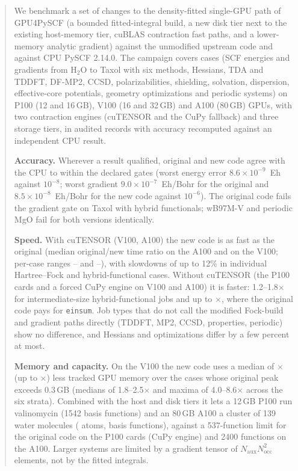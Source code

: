 \begin{abstract}
\noindent We benchmark a set of changes to the density-fitted single-GPU path of GPU4PySCF (a bounded fitted-integral build, a new disk tier next to the existing host-memory tier, cuBLAS contraction fast paths, and a lower-memory analytic gradient) against the unmodified upstream code and against CPU PySCF 2.14.0. The campaign covers \NCasesRun{} cases (SCF energies and gradients from H$_2$O to Taxol with six methods, Hessians, TDA and TDDFT, DF-MP2, CCSD, polarizabilities, shielding, solvation, dispersion, effective-core potentials, geometry optimizations and periodic systems) on P100 (12 and 16\,GB), V100 (16 and 32\,GB) and A100 (80\,GB) GPUs, with two contraction engines (cuTENSOR and the CuPy fallback) and three storage tiers, in \NAuditedRecords{} audited records with accuracy recomputed against an independent CPU result.

\noindent\textbf{Accuracy.} Wherever a result qualified, original and new code agree with the CPU to within the declared gates (worst energy error $8.6\times10^{-9}$~Eh against $10^{-8}$; worst gradient $9.0\times10^{-7}$~Eh/Bohr for the original and $8.5\times10^{-8}$~Eh/Bohr for the new code against $10^{-6}$). The original code fails the gradient gate on Taxol with hybrid functionals; wB97M-V and periodic MgO fail for both versions identically.

\noindent\textbf{Speed.} With cuTENSOR (V100, A100) the new code is as fast as the original (median original/new time ratio \MedianAllAHund{} on the A100 and \MedianAllVHund{} on the V100; per-case ranges \MinAllAHund--\MaxAllAHund{} and \MinAllVHund--\MaxAllVHund), with slowdowns of up to 12\% in individual Hartree--Fock and hybrid-functional cases. Without cuTENSOR (the P100 cards and a forced CuPy engine on V100 and A100) it is faster: 1.2--1.8$\times$ for intermediate-size hybrid-functional jobs and up to \MaxAllAHundCupy$\times$, where the original code pays for \texttt{einsum}. Job types that do not call the modified Fock-build and gradient paths directly (TDDFT, MP2, CCSD, properties, periodic) show no difference, and Hessians and optimizations differ by a few percent at most.

\noindent\textbf{Memory and capacity.} On the V100 the new code uses a median of \MemMedian$\times$ (up to \MemMax$\times$) less tracked GPU memory over the \MemN{} cases whose original peak exceeds 0.3\,GB (medians of 1.8--2.5$\times$ and maxima of 4.0--8.6$\times$ across the six strata). Combined with the host and disk tiers it lets a 12\,GB P100 run valinomycin (1542 basis functions) and an 80\,GB A100 a cluster of 139 water molecules (\BiggestAtoms{} atoms, \BiggestAOs{} basis functions), against a 537-function limit for the original code on the P100 cards (CuPy engine) and 2400 functions on the A100. Larger systems are limited by a gradient tensor of $N_\mathrm{aux}N_\mathrm{occ}^2$ elements, not by the fitted integrals.


\end{abstract}
